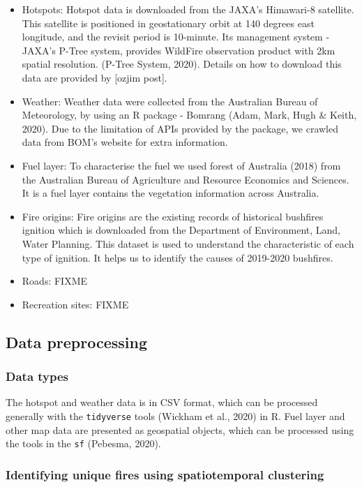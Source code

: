 \documentclass[11pt,a4paper,]{article}
\begin{document}
\begin{itemize}
\item
  Hotspots: Hotspot data is downloaded from the JAXA's Himawari-8 satellite. This satellite is positioned in geostationary orbit at 140 degrees east longitude, and the revisit period is 10-minute. Its management system - JAXA's P-Tree system, provides WildFire observation product with 2km spatial resolution. (P-Tree System, 2020). Details on how to download this data are provided by {[}ozjim post{]}.
\item
  Weather: Weather data were collected from the Australian Bureau of Meteorology, by using an R package - Bomrang (Adam, Mark, Hugh \& Keith, 2020). Due to the limitation of APIs provided by the package, we crawled data from BOM's website for extra information.
\item
  Fuel layer: To characterise the fuel we used forest of Australia (2018) from the Australian Bureau of Agriculture and Resource Economics and Sciences. It is a fuel layer contains the vegetation information across Australia.
\item
  Fire origins: Fire origins are the existing records of historical bushfires ignition which is downloaded from the Department of Environment, Land, Water Planning. This dataset is used to understand the characteristic of each type of ignition. It helps us to identify the causes of 2019-2020 bushfires.
\item
  Roads: FIXME
\item
  Recreation sites: FIXME
\end{itemize}

\hypertarget{data-preprocessing}{%
\subsection{Data preprocessing}\label{data-preprocessing}}

\hypertarget{data-types}{%
\subsubsection{Data types}\label{data-types}}

The hotspot and weather data is in CSV format, which can be processed generally with the \texttt{tidyverse} tools (Wickham et al., 2020) in R. Fuel layer and other map data are presented as geospatial objects, which can be processed using the tools in the \texttt{sf} (Pebesma, 2020).

\hypertarget{identifying-unique-fires-using-spatiotemporal-clustering}{%
\subsubsection{Identifying unique fires using spatiotemporal clustering}\label{identifying-unique-fires-using-spatiotemporal-clustering}}
\end{document}
